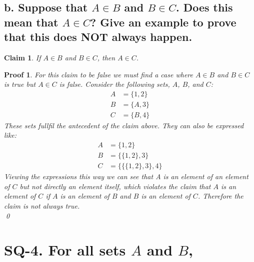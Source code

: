 \documentclass{article}
\newtheorem*{claim}{Claim}
\newtheorem*{poof}{Proof}
\begin{document}
\subsection*{b. Suppose that $A \in B$ and $B \in C$. Does this mean that $A \in C$? Give an example to prove that this does NOT always happen.}
\begin{claim}
    If $A \in B$ and $B \in C$, then $A \in C$.
\end{claim}
\begin{poof}
    For this claim to be false we must find a case where $A \in B$ and $B \in C$ is true but $A \in C$ is false. Consider the following sets, $A$, $B$, and $C$:
    \begin{align*}
        A &= \{1,2\}\\
        B&= \{A,3\}\\
        C&=\{B,4\}
    \end{align*}  
    These sets fullfil the antecedent of the claim above. They can also be expressed like:
    \begin{align*}
        A &= \{1,2\}\\
        B&= \{\{1,2\},3\}\\
        C&=\{\{\{1,2\},3\},4\}
    \end{align*}
    Viewing the expressions this way we can see that A is an element of an element of $C$ but not directly an element itself, which violates the claim that $A$ is an element of $C$ if $A$ is an element of $B$ and $B$ is an element of $C$. Therefore the claim is not always true.\\  
    \qed
\end{poof}

\newpage

\section*{SQ-4. For all sets $A$ and $B$,}
\end{document}
